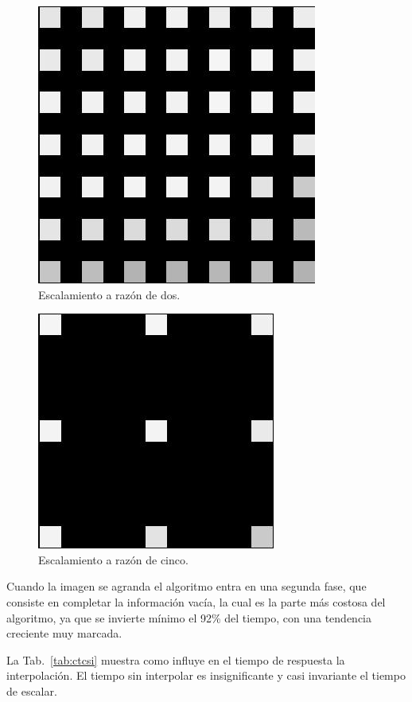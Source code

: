 \begin{figure}[ht!]
	\centering
	\includegraphics[scale=.5]{img/er2}
	\caption{Escalamiento a razón de dos.}
	\label{img:er2}
\end{figure}

\begin{figure}[ht!]
	\centering
	\includegraphics[scale=.5]{img/er5}
	\caption{Escalamiento a razón de cinco.}
	\label{img:er5}
\end{figure}

Cuando la imagen se agranda el algoritmo entra en una segunda fase, que consiste en completar la información vacía, la cual es la parte más costosa del algoritmo, ya que se invierte mínimo el 92\% del tiempo, con una tendencia creciente muy marcada.

La Tab.~\ref{tab:ctcsi} muestra como influye en el tiempo de respuesta la interpolación. El tiempo sin interpolar es insignificante y casi invariante el tiempo de escalar.


